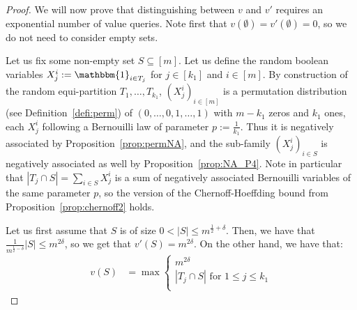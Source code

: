 \begin{proof}
  We will now prove that distinguishing between $v$ and $v'$ requires an exponential number of value queries. Note first that $v(\emptyset) = v'(\emptyset) = 0$, so we do not need to consider empty sets.

  Let us fix some non-empty set $S \subseteq [m]$. Let us define the random boolean variables $X_j^i := \mathbbm{1}_{i \in T_j}$ for $j \in [k_1]$ and $i \in [m]$. By construction of the random equi-partition $T_1, \ldots, T_{k_1}$, $(X_j^i)_{i \in [m]}$ is a permutation distribution (see Definition~\ref{defi:perm}) of $(0,\ldots,0,1,\ldots,1)$ with $m-k_1$ zeros and $k_1$ ones, each $X_j^i$ following a Bernouilli law of parameter $p := \frac{1}{k_1}$. Thus it is negatively associated by Proposition~\ref{prop:permNA}, and the sub-family $(X_j^i)_{i \in S}$ is negatively associated as well by Proposition~\ref{prop:NA_P4}. Note in particular that $|T_j \cap S| = \sum_{i \in S} X_j^i$ is a sum of negatively associated Bernouilli variables of the same parameter $p$, so the version of the Chernoff-Hoeffding bound from Proposition~\ref{prop:chernoff2} holds.
  
  Let us first assume that $S$ is of size $0 < |S| \leq m^{\frac{1}{2}+\delta}$. Then, we have that $\frac{1}{m^{\frac{1}{2}-\delta}}|S| \leq m^{2\delta}$, so we get that $v'(S) = m^{2\delta}$. On the other hand, we have that:
    \begin{equation}
    \begin{aligned}
      v(S) &= \max\begin{cases}
      m^{2\delta}\\
      |T_j \cap S| \text{ for } 1 \leq j \leq k_1\\
      \end{cases}
    \end{aligned}
    \end{equation}


\end{proof}
